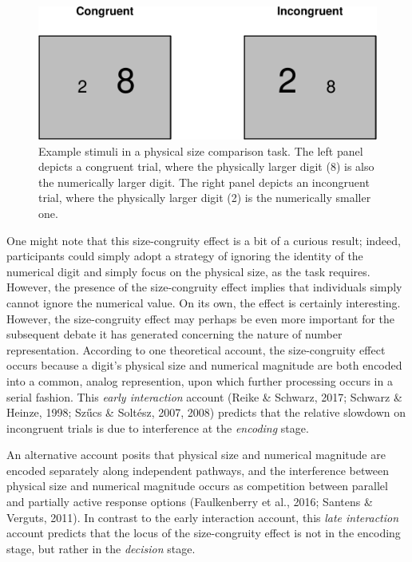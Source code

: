 \documentclass[english,,man]{apa6}
\theoremstyle{definition}
\theoremstyle{definition}
\theoremstyle{definition}
\theoremstyle{remark}
\begin{document}
\begin{figure}
\centering
\includegraphics{paper_files/figure-latex/sceFigure-1.pdf}
\caption{\label{fig:sceFigure}Example stimuli in a physical size comparison
task. The left panel depicts a congruent trial, where the physically
larger digit (8) is also the numerically larger digit. The right panel
depicts an incongruent trial, where the physically larger digit (2) is
the numerically smaller one.}
\end{figure}

One might note that this size-congruity effect is a bit of a curious
result; indeed, participants could simply adopt a strategy of ignoring
the identity of the numerical digit and simply focus on the physical
size, as the task requires. However, the presence of the size-congruity
effect implies that individuals simply cannot ignore the numerical
value. On its own, the effect is certainly interesting. However, the
size-congruity effect may perhaps be even more important for the
subsequent debate it has generated concerning the nature of number
representation. According to one theoretical account, the size-congruity
effect occurs because a digit's physical size and numerical magnitude
are both encoded into a common, analog represention, upon which further
processing occurs in a serial fashion. This \emph{early interaction}
account (Reike \& Schwarz, 2017; Schwarz \& Heinze, 1998; Szűcs \&
Soltész, 2007, 2008) predicts that the relative slowdown on incongruent
trials is due to interference at the \emph{encoding} stage.

An alternative account posits that physical size and numerical magnitude
are encoded separately along independent pathways, and the interference
between physical size and numerical magnitude occurs as competition
between parallel and partially active response options (Faulkenberry et
al., 2016; Santens \& Verguts, 2011). In contrast to the early
interaction account, this \emph{late interaction} account predicts that
the locus of the size-congruity effect is not in the encoding stage, but
rather in the \emph{decision} stage.
\end{document}
